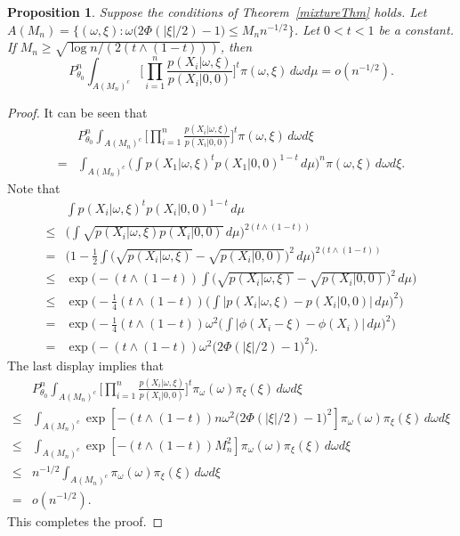 \documentclass[11pt]{article}
\theoremstyle{plain}
\newtheorem{proposition}{\quad\quad Proposition}
\theoremstyle{definition}
\theoremstyle{remark}
\begin{document}
\begin{appendices}
\begin{proposition}\label{lastProp}
    Suppose the conditions of Theorem~\ref{mixtureThm} holds.
    Let $A(M_n)=\{(\omega, \xi): \omega \big( 2\Phi(|\xi|/2)-1\big)\leq M_n n^{-1/2}\}$.
    Let $0<t<1$ be a constant.
    If $M_n \geq \sqrt{{\log n}/(2(t\wedge (1-t)))}$, then
    \begin{equation*}
        P^n_{\theta_0} \int_{A(M_n)^c} \Big[\prod_{i=1}^n \frac{p(X_i|\omega,\xi)}{p(X_i|0,0)}\Big]^t \pi(\omega,\xi)\, d\omega d\mu =o(n^{-1/2}).
    \end{equation*}
\end{proposition}
\begin{proof}
    It can be seen that
\begin{equation*}
    \begin{split}
    &P^n_{\theta_0} \int_{A(M_n)^c} \Big[\prod_{i=1}^n \frac{p(X_i|\omega,\xi)}{p(X_i|0,0)}\Big]^t \pi(\omega,\xi)\, d\omega d\xi
    \\
    =&
    \int_{A(M_n)^c} \big( \int p(X_1|\omega,\xi)^t p(X_1|0,0)^{1-t}\, d\mu\big)^n \pi(\omega,\xi)\, d\omega d\xi.
    \end{split}
\end{equation*}
Note that
\begin{align*}
    &\int p(X_i|\omega,\xi)^t p(X_i|0,0)^{1-t}\, d\mu
    \\
    \leq&  \Big(\int \sqrt{p(X_i|\omega,\xi) p(X_i|0,0)}\, d\mu\Big)^{2(t\wedge (1-t))}
    \\
= & \Big(1-\frac{1}{2}\int \big(\sqrt{p(X_i|\omega,\xi) }-\sqrt{p(X_i|0,0)}\big)^2\, d\mu\Big)^{2(t\wedge (1-t))}
\\
\leq & \exp \Big( -(t\wedge (1-t))\int \big(\sqrt{p(X_i|\omega,\xi) }-\sqrt{p(X_i|0,0)}\big)^2\, d\mu \Big)
\\
\leq & \exp \Big( -\frac{1}{4}(t\wedge (1-t)) \big(\int \big| p(X_i|\omega,\xi)-p(X_i|0,0)\big|\, d\mu \big)^2 \Big)
\\
= & \exp \Big( -\frac{1}{4}(t\wedge (1-t)) \omega^2 \big(\int \big| \phi(X_i -\xi)-\phi (X_i)\big|\, d\mu \big)^2 \Big)
\\
= & \exp \Big( -(t\wedge (1-t)) \omega^2 \big( 2\Phi(|\xi|/2)-1\big)^2 \Big).
\end{align*}
The last display implies that
\begin{align*}
    &P^n_{\theta_0} \int_{A(M_n)^c} \Big[\prod_{i=1}^n \frac{p(X_i|\omega,\xi)}{p(X_i|0,0)}\Big]^t \pi_{\omega}(\omega)\pi_{\xi}(\xi)\, d\omega d\xi
\\
    \leq
    &
    \int_{A(M_n)^c} \exp \left[ -(t\wedge (1-t)) n\omega^2 \big( 2\Phi(|\xi|/2)-1\big)^2 \right]
    \pi_{\omega}(\omega) \pi_\xi(\xi)\, d\omega d\xi
    \\
    \leq
    &
    \int_{A(M_n)^c} \exp \left[ -(t\wedge (1-t)) M_n^2 \right]
    \pi_{\omega}(\omega) \pi_\xi(\xi)\, d\omega d\xi
\\
    \leq
    &
    n^{-1/2}
    \int_{A(M_n)^c} 
\pi_{\omega}(\omega) \pi_\xi(\xi)\, d\omega d\xi
\\
=&o(n^{-1/2}).
\end{align*}
This completes the proof.





\end{proof}
\end{appendices}
\end{document}
